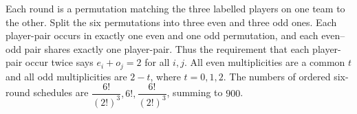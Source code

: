 Each round is a permutation matching the three labelled players on one team to the other. Split the six permutations into three even and three odd ones. Each player-pair occurs in exactly one even and one odd permutation, and each even--odd pair shares exactly one player-pair. Thus the requirement that each player-pair occur twice says $e_i+o_j=2$ for all $i,j$. All even multiplicities are a common $t$ and all odd multiplicities are $2-t$, where $t=0,1,2$. The numbers of ordered six-round schedules are $\dfrac{6!}{(2!)^3},6!,\dfrac{6!}{(2!)^3}$, summing to $\boxed{900}$.

